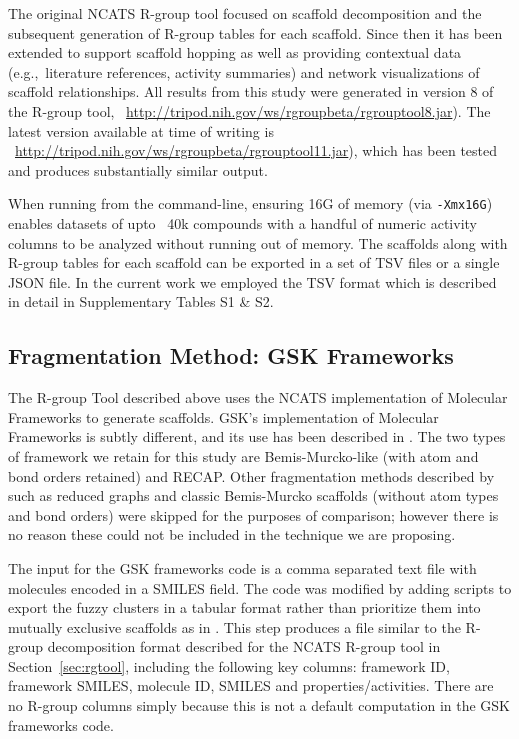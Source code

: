 \documentclass[journal=jacsat,manuscript=article]{achemso}
\newcommand*\sref[1]{Section~\ref{sec:#1}}
\newcommand*\eg{e.g.,~}
\begin{document}
The original NCATS R-group tool focused on scaffold decomposition and
the subsequent generation of R-group tables for each scaffold. Since
then it has been extended to support scaffold hopping as well as
providing contextual data (\eg literature references, activity
summaries) and network visualizations of scaffold relationships. All
results from this study were generated in version 8 of the R-group tool,
~\url{http://tripod.nih.gov/ws/rgroupbeta/rgrouptool8.jar}). The
latest version available at time of writing is
~\url{http://tripod.nih.gov/ws/rgroupbeta/rgrouptool11.jar}), which has been
tested and produces substantially similar output.

When running from the command-line, ensuring 16G of memory (via
\texttt{-Xmx16G}) enables datasets of upto ~40k compounds with a
handful of numeric activity columns to be analyzed without running out
of memory. The scaffolds along with R-group tables for each scaffold
can be exported in a set of TSV files or a single JSON file. In the
current work we employed the TSV format which is described in detail
in Supplementary Tables S1 \& S2.

\subsection{Fragmentation Method: GSK Frameworks}
\label{sec:gskframe}
The R-group Tool described above uses the NCATS implementation of
Molecular Frameworks to generate scaffolds. GSK's implementation of
Molecular Frameworks is subtly different, and its use has been
described in \citeauthor{Harper2004DDclus}. The two types of framework
we retain for this study are Bemis-Murcko-like\cite{BemisMurcko1996}
(with atom and bond orders retained) and
RECAP\cite{Lewell:1998aa}. Other fragmentation methods described by
\citeauthor{Harper2004DDclus} such as reduced graphs and classic
Bemis-Murcko scaffolds (without atom types and bond orders) were
skipped for the purposes of comparison; however there is no reason
these could not be included in the technique we are proposing.

The input for the GSK frameworks code is a comma separated text file
with molecules encoded in a SMILES field.  The code was modified by
adding scripts to export the fuzzy clusters in a tabular format rather
than prioritize them into mutually exclusive scaffolds as in
\citeauthor{Harper2004DDclus}. This step produces a file similar to
the R-group decomposition format described for the NCATS R-group tool
in \sref{rgtool}, including the following key columns: framework ID, framework SMILES, molecule ID, SMILES
and properties/activities.  There are no R-group
columns simply because this is not a default computation in the GSK
frameworks code.
\end{document}
